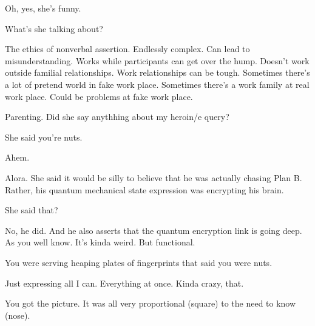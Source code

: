 

Oh, yes, she's funny.

What's she talking about?

The ethics of nonverbal assertion.  Endlessly complex.  Can lead to
misunderstanding.  Works while participants can get over the hump.
Doesn't work outside familial relationships.  Work relationships can
be tough.  Sometimes there's a lot of pretend world in fake work
place.  Sometimes there's a work family at real work place.  Could be
problems at fake work place.

Parenting.  Did she say anythhing about my heroin/e query?  

She said you're nuts.

Ahem.

Alora.  She said it would be silly to believe that he was actually
chasing Plan B.  Rather, his quantum mechanical state expression was
encrypting his brain.

She said that?

No, he did.  And he also asserts that the quantum encryption link is
going deep.  As you well know.  It's kinda weird.  But functional.

You were serving heaping plates of fingerprints that said you were
nuts.  

Just expressing all I can.  Everything at once.  Kinda crazy, that.

You got the picture.  It was all very proportional (square) to the
need to know (nose).

\bye
